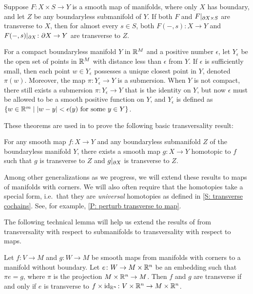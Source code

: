 \begin{theorem}
	Suppose $F \colon X\times S\to Y$ is a smooth map of manifolds, where only $X$ has boundary, and let $Z$ be any boundaryless submanifold of $Y$.
	If both $F$ and $F|_{\partial X\times S}$ are transverse to $X$, then for almost every $s\in S$, both $F(-,s) \colon X\to Y$ and $F(-,s)|_{\partial X} \colon \partial X\to Y$ are transverse to $Z$.
\end{theorem}

\begin{theorem}
	For a compact boundaryless manifold $Y$ in $\mathbb{R}^M$ and a positive number $\epsilon$, let $Y_\epsilon$ be the open set of points in $\mathbb{R}^M$ with distance less than $\epsilon$ from $Y$.
	If $\epsilon$ is sufficiently small, then each point $w\in Y_\epsilon$ possesses a unique closest point in $Y$, denoted $\pi(w)$.
	Moreover, the map $\pi \colon Y_\epsilon\to Y$ is a submersion.
	When $Y$ is not compact, there still exists a submersion $\pi \colon Y_\epsilon\to Y$ that is the identity on $Y$, but now $\epsilon$ must be allowed to be a smooth positive function on $Y$, and $Y_\epsilon$ is defined as $\{w\in \mathbb{R}^m \mid |w-y|<\epsilon(y) \text{\ for some\ } y \in Y\}$.
\end{theorem}

These theorems are used in \cite{GuPo74} to prove the following basic transversality result:

\begin{theorem}
	For any smooth map $f \colon X\to Y$ and any boundaryless submanifold $Z$ of the boundaryless manifold $Y$, there exists a smooth map $g \colon X\to Y$ homotopic to $f$ such that $g$ is transverse to $Z$ and $g|_{\partial X}$ is transverse to $Z$.
\end{theorem}

Among other generalizations as we progress, we will extend these results to maps of manifolds with corners.
We will also often require that the homotopies take a special form, i.e.\ that they are {\it universal} homotopies as defined in \cref{S: transverse cochains}.
See, for example, \cref{P: perturb transverse to map}.

The following technical lemma will help us extend the results of \cite{GuPo74} from transversality with respect to submanifolds to transversality with respect to maps.

\begin{lemma}\label{L: all transversality is wrt embeddings}
	Let $f \colon V\to M$ and $g \colon W\to M$ be smooth maps from manifolds with corners to a manifold without boundary.
	Let $e \colon W\to M\times \mathbb{R}^n$ be an embedding such that $\pi e=g$, where $\pi$ is the projection $M\times \mathbb{R}^n\to M$.
	Then $f$ and $g$ are transverse if and only if $e$ is transverse to $f\times\mathrm{id}_{\mathbb{R}^n} \colon V\times \mathbb{R}^n\to M\times \mathbb{R}^n$.
\end{lemma}

